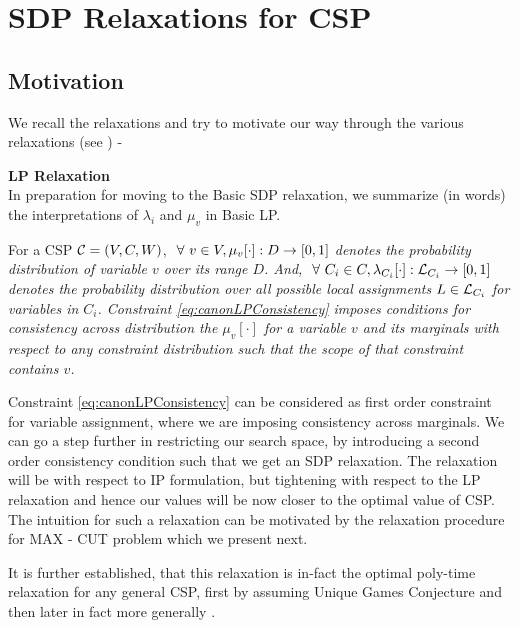 \section{SDP Relaxations for CSP}

\subsection{Motivation}

We recall the relaxations and try to motivate our way through the various relaxations (see \cite{Ryan}) -

\begin{discussion}{\bf LP Relaxation}\\
In preparation for moving to the Basic SDP relaxation, we summarize (in words) the interpretations of $\lambda_i$ and $\mu_v$ in Basic LP.

For a CSP $\mathcal{C} = (V, C, W)$,  \textit{$\ \forall \  v \in V, \mu_v[\cdot] : D \rightarrow [0, 1]$ denotes the \textit{probability distribution of variable $v$ over its range $D$}. And, $\ \forall \  C_i \in C, \lambda_{C_i}[\cdot] : \mathcal{L}_{C_i} \rightarrow [0,1]$ denotes the probability distribution over all possible local assignments $L \in \mathcal{L}_{C_i}$ for variables in  $C_i$.  
Constraint \ref{eq:canonLPConsistency} imposes conditions for consistency across distribution the $\mu_v[\cdot]$ for a variable $v$ and its marginals with respect to any constraint distribution such that the scope of that constraint contains $v$.}
\end{discussion}

Constraint \ref{eq:canonLPConsistency} can be considered as first order constraint for variable assignment, where we are imposing consistency across marginals. 
We can go a step further in restricting our search space, by introducing a second order consistency condition such that we get an SDP relaxation. 
The relaxation will be with respect to IP formulation, but tightening with respect to the LP relaxation and hence our values will be now closer to the optimal value of CSP. 
The intuition for such a relaxation can be motivated by the relaxation procedure for MAX - CUT problem which we present next. 

It is further established, that this relaxation is in-fact the optimal poly-time relaxation for any general CSP, first by assuming Unique Games Conjecture \cite{Khot} and then later in fact more generally \cite{nphard}. 

